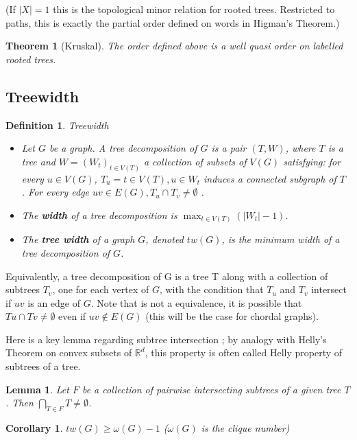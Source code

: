 \documentclass[12pt,a4paper]{article}
\def\R{\mathbb{R}}
\newtheorem{theorem}{Theorem}
\newtheorem{corollary}{Corollary}
\newtheorem{lemma}{Lemma}
\newtheorem{definition}{Definition}
\begin{document}
(If $| X | = 1$ this is the topological minor relation for rooted
trees. Restricted to paths, this is exactly the partial order defined on words
in Higman's Theorem.)

\begin{theorem}[Kruskal]
  The order defined above is a well quasi order on labelled rooted trees.
\end{theorem}


\subsection{Treewidth}

\begin{definition}{Treewidth}
  \begin{itemize}
  \item Let $G$ be a graph. A tree decomposition of $G$ is a pair $( T, W )$,
    where $T$ is a tree and $W = ( W_t )_{t \in V ( T )}$ a collection of
    subsets of $V ( G )$ satisfying: for every $u \in V ( G )$,
    $T_u = { t \in V ( T ), u \in W_t }$ induces a connected subgraph of $T$ .
    For every edge $uv \in E ( G ), T_u \cap T_v \neq \emptyset$ .
  \item The \textbf{width} of a tree decomposition is
    $\max_{t \in V ( T )}(| W_t | − 1 )$.
  \item The \textbf{tree width} of a graph $G$, denoted $tw ( G )$, is the
    minimum width of a tree decomposition of $G$.
  \end{itemize}
\end{definition}

Equivalently, a tree decomposition of G is a tree T along with a collection of
subtrees $T_v$, one for each vertex of $G$, with the condition that $T_u$ and
$T_v$ intersect if $uv$ is an edge of $G$. Note that is not a equivalence, it is
possible that $T u \cap T v \neq \emptyset$ even if $uv \notin E ( G )$ (this
will be the case for chordal graphs).

Here is a key lemma regarding subtree intersection ; by analogy with Helly's
Theorem on convex subsets of $\R^d$, this property is often called Helly
property of subtrees of a tree.

\begin{lemma}
  Let $F$ be a collection of pairwise intersecting subtrees of a given tree
  $T$. Then $\bigcap_{T \in F} T \neq \emptyset$.
\end{lemma}

\begin{corollary}
  $tw( G ) \geq \omega( G ) - 1$ ($\omega( G )$ is the clique number)
\end{corollary}
\end{document}
